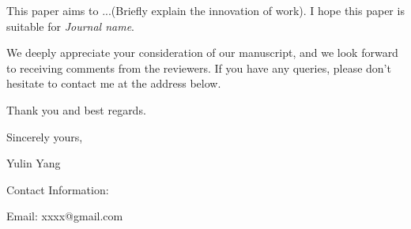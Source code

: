 \documentclass{article}
\begin{document}
This paper aims to ...(Briefly explain the innovation of work). I hope this paper is suitable for \textit{Journal name}.

We deeply appreciate your consideration of our manuscript, and we look forward to receiving comments from the reviewers. If you have any queries, please don’t hesitate to contact me at the address below.

Thank you and best regards.

\bigskip %

Sincerely yours,

\vspace{20pt} %

Yulin Yang

Contact Information:

Email: xxxx@gmail.com
\end{document}
